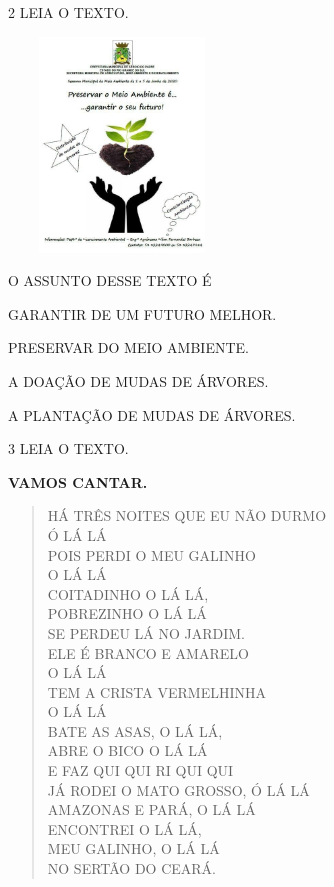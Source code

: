 
\num{2} LEIA O TEXTO.

\includegraphics[width=2.37500in,height=2.25000in]{media/image166.jpg}


O ASSUNTO DESSE TEXTO É

\begin{escolha}
\item GARANTIR DE UM FUTURO MELHOR.

\item PRESERVAR DO MEIO AMBIENTE.

\item A DOAÇÃO DE MUDAS DE ÁRVORES.

\item A PLANTAÇÃO DE MUDAS DE ÁRVORES.
\end{escolha}


\num{3} LEIA O TEXTO.

\textbf{VAMOS CANTAR.}

\begin{verse}
HÁ TRÊS NOITES QUE EU NÃO DURMO\\
Ó LÁ LÁ\\
POIS PERDI O MEU GALINHO\\
O LÁ LÁ\\
COITADINHO O LÁ LÁ,\\
POBREZINHO O LÁ LÁ\\
SE PERDEU LÁ NO JARDIM.\\
ELE É BRANCO E AMARELO\\
O LÁ LÁ\\
TEM A CRISTA VERMELHINHA\\
O LÁ LÁ\\
BATE AS ASAS, O LÁ LÁ,\\
ABRE O BICO O LÁ LÁ\\
E FAZ QUI QUI RI QUI QUI\\
JÁ RODEI O MATO GROSSO, Ó LÁ LÁ\\
AMAZONAS E PARÁ, O LÁ LÁ\\
ENCONTREI O LÁ LÁ,\\
MEU GALINHO, O LÁ LÁ\\
NO SERTÃO DO CEARÁ.
\end{verse}

